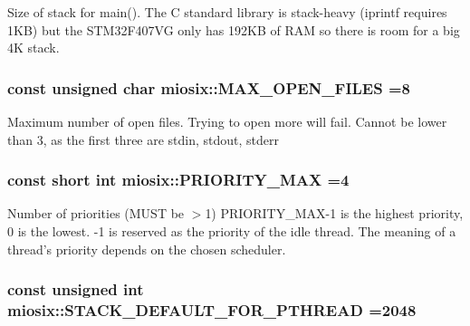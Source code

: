 Size of stack for main(). The C standard library is stack-\/heavy (iprintf requires 1\-K\-B) but the S\-T\-M32\-F407\-V\-G only has 192\-K\-B of R\-A\-M so there is room for a big 4\-K stack. \hypertarget{group___settings_ga0ec1a8ab604e6a08eec2994d436346f7}{
\subsubsection[{M\-A\-X\-\_\-\-O\-P\-E\-N\-\_\-\-F\-I\-L\-E\-S}]{\setlength{\rightskip}{0pt plus 5cm}const unsigned char miosix\-::\-M\-A\-X\-\_\-\-O\-P\-E\-N\-\_\-\-F\-I\-L\-E\-S =8}}\label{group___settings_ga0ec1a8ab604e6a08eec2994d436346f7}
Maximum number of open files. Trying to open more will fail. Cannot be lower than 3, as the first three are stdin, stdout, stderr \hypertarget{group___settings_ga8c0365b6cd111f990937319e4499962b}{
\subsubsection[{P\-R\-I\-O\-R\-I\-T\-Y\-\_\-\-M\-A\-X}]{\setlength{\rightskip}{0pt plus 5cm}const short int miosix\-::\-P\-R\-I\-O\-R\-I\-T\-Y\-\_\-\-M\-A\-X =4}}\label{group___settings_ga8c0365b6cd111f990937319e4499962b}
Number of priorities (M\-U\-S\-T be $>$1) P\-R\-I\-O\-R\-I\-T\-Y\-\_\-\-M\-A\-X-\/1 is the highest priority, 0 is the lowest. -\/1 is reserved as the priority of the idle thread. The meaning of a thread's priority depends on the chosen scheduler. \hypertarget{group___settings_ga466ea8e233d84803e31f3e9d9d978cfd}{
\subsubsection[{S\-T\-A\-C\-K\-\_\-\-D\-E\-F\-A\-U\-L\-T\-\_\-\-F\-O\-R\-\_\-\-P\-T\-H\-R\-E\-A\-D}]{\setlength{\rightskip}{0pt plus 5cm}const unsigned int miosix\-::\-S\-T\-A\-C\-K\-\_\-\-D\-E\-F\-A\-U\-L\-T\-\_\-\-F\-O\-R\-\_\-\-P\-T\-H\-R\-E\-A\-D =2048}}\label{group___settings_ga466ea8e233d84803e31f3e9d9d978cfd}
